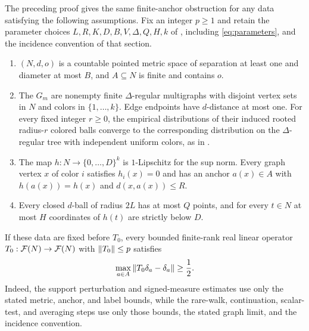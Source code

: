 \begin{remark}\label{rem:abstract-obstruction}
The preceding proof gives the same finite-anchor obstruction for any data
satisfying the following assumptions. Fix an integer $p\ge1$
and retain the parameter choices
$L,R,K,D,B,V,\Delta,Q,H,k$ of , including
\eqref{eq:parameters}, and the incidence convention of that section.
\begin{enumerate}[label=(\roman*)]
\item $(N,d,o)$ is a countable pointed metric space of separation at
least one and diameter at most $B$, and $A\subseteq N$ is finite
and contains $o$.
\item The $G_m$ are nonempty finite $\Delta$-regular multigraphs with disjoint
vertex sets in $N$ and colors in $\{1,\ldots,k\}$. Edge endpoints
have $d$-distance at most one. For every fixed integer $r\ge0$, the
empirical distributions of their induced rooted radius-$r$ colored
balls converge to the corresponding distribution on the $\Delta$-regular
tree with independent uniform colors, as in .
\item The map $h:N\to\{0,\ldots,D\}^k$ is $1$-Lipschitz for the sup
norm. Every graph vertex $x$ of color $i$ satisfies $h_i(x)=0$ and
has an anchor $a(x)\in A$ with $h(a(x))=h(x)$ and $d(x,a(x))\le R$.
\item Every closed $d$-ball of radius $2L$ has at most $Q$ points,
and for every $t\in N$ at most $H$ coordinates of $h(t)$ are strictly below $D$.
\end{enumerate}
If these data are fixed before $T_0$, every bounded finite-rank real
linear operator $T_0:\mathcal F(N)\to\mathcal F(N)$ with $\left\|T_0\right\|\le p$ satisfies
\[
 \max_{a\in A}\left\|T_0\delta_a-\delta_a\right\|\ge\frac12.
\]
Indeed, the support perturbation and signed-measure estimates use only
the stated metric, anchor, and label bounds, while the rare-walk,
continuation, scalar-test, and averaging steps use only those bounds,
the stated graph limit, and the incidence convention.
\end{remark}
